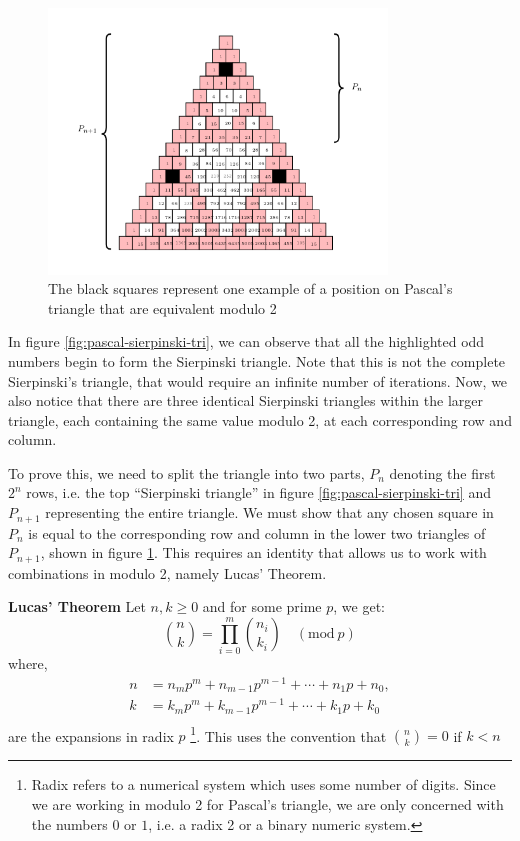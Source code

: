 \documentclass[11pt]{article}
\begin{document}
\begin{enumerate}
\begin{figure}[htbp]
\centering
\includegraphics[width=9cm]{media/tikz/row-column-pascal.png}
\caption{\label{fig:row-column-pascal}The black squares represent one example of a position on Pascal's triangle that are equivalent modulo 2}
\end{figure}

In figure \ref{fig:pascal-sierpinski-tri}, we can observe that all the highlighted odd numbers begin to form the Sierpinski triangle. Note that this is not the complete Sierpinski's triangle, that would require an infinite number of iterations. Now, we also notice that there are three identical Sierpinski triangles within the larger triangle, each containing the same value modulo 2, at each corresponding row and column.

To prove this, we need to split the triangle into two parts, \(P_{n}\) denoting the first \(2^{n}\) rows, i.e. the top ``Sierpinski triangle'' in figure \ref{fig:pascal-sierpinski-tri} and \(P_{n+1}\) representing the entire triangle. We must show that any chosen square in \(P_{n}\) is equal to the corresponding row and column in the lower two triangles of \(P_{n+1}\), shown in figure \ref{fig:row-column-pascal}. This requires an identity that allows us to work with combinations in modulo 2, namely Lucas' Theorem.

\textbf{Lucas' Theorem}
Let \(n,k \ge 0\) and for some prime \(p\), we get:
\begin{equation}
\binom{n}{k} = \prod_{i=0}^{m} \binom{n_i}{k_i} \quad (\text{mod}~p)
\end{equation}
where,
\begin{align*}
n &= n_{m}p^{m}+n_{m-1}p^{m-1}+\cdots + n_{1}p+n_{0},\\
k &= k_{m}p^{m}+k_{m-1}p^{m-1}+\cdots + k_{1}p+k_{0}\\
\end{align*}
are the expansions in radix \(p\) \footnote{Radix refers to a numerical system which uses some number of digits. Since we are working in modulo 2 for Pascal's triangle, we are only concerned with the numbers \(0\) or \(1\), i.e. a radix 2 or a binary numeric system.}. This uses the convention that \(\binom{n}{k} = 0\) if \(k < n\)


\end{enumerate}
\end{document}
